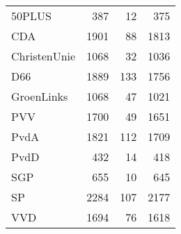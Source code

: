 \begin{tabular}{lrrr}
\toprule
50PLUS       &   387 &   12 &   375 \\
CDA          &  1901 &   88 &  1813 \\
ChristenUnie &  1068 &   32 &  1036 \\
D66          &  1889 &  133 &  1756 \\
GroenLinks   &  1068 &   47 &  1021 \\
PVV          &  1700 &   49 &  1651 \\
PvdA         &  1821 &  112 &  1709 \\
PvdD         &   432 &   14 &   418 \\
SGP          &   655 &   10 &   645 \\
SP           &  2284 &  107 &  2177 \\
VVD          &  1694 &   76 &  1618 \\
\bottomrule
\end{tabular}

